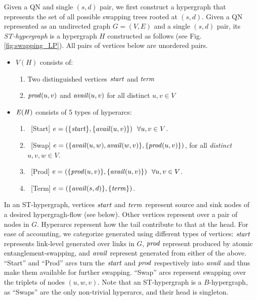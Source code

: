 Given a QN and single $(s,d)$ pair, we first construct a hypergraph 
that represents the set of all possible swapping trees rooted
at $(s,d)$.
Given a QN represented as an undirected graph $G=(V,E)$
and a single $(s,d)$ pair, its \emph{ST-hypergraph} 
is a hypergraph $H$ constructed as follows  (see 
Fig. \ref{fig:swapping_LP}). All pairs of 
vertices below are unordered pairs.
\begin{itemize}
\item $V(H)$ consists of:
  \begin{enumerate}
  \item Two distinguished vertices $\mathit{start}$ and $\mathit{term}$
  \item $\mathit{prod}(u,v)$ and $\mathit{avail}(u,v)$ for all distinct $u, v \in
    V$
  \end{enumerate}
\item $\mathit{E(H)}$ consists of 5 types of hyperarcs:
  \begin{enumerate}
  \item\ [Start] $e = (\{\mathit{start}\}, \{\mathit{avail}(u,v)\}) \ \ \forall u,v \in V$.
  \item\ [Swap] $e = (\{\mathit{avail}(u,w),  \mathit{avail}(w,v)\}, \{\mathit{prod}(u,v)\})$, for all \emph{distinct} $u,v,w \in V$.
  \item\ [Prod] $e = (\{\mathit{prod}(u,v)\}, \{\mathit{avail}(u,v)\})\ \ \forall u,v \in V$.
  \item\ [Term]  $e = (\{\mathit{avail}(s,d)\}, \{\mathit{term}\})$.
  \end{enumerate}
 \end{itemize}
In an ST-hypergraph, vertices $\mathit{start}$ and $\mathit{term}$
represent source and sink nodes of a desired hypergragh-flow (see below).
Other vertices represent \epss over a pair of nodes in $G$.
Hyperarcs
represent how the tail \epss contribute to that at the head. 
For ease of accounting, we categorize generated \epss using different
types of vertices:
$\mathit{start}$ represents link-level \epss generated over links in $G$, 
%
$\mathit{prod}$ represent \epss produced by atomic entanglement-swapping, 
%
and $\mathit{avail}$ represent \epss generated from either of the above.
``Start'' and ``Prod'' arcs turn the $\mathit{start}$ and 
$\mathit{prod}$ \epss respectively into  $\mathit{avail}$ \epss and 
thus make them available for further swapping. 
``Swap'' arcs represent swapping over the triplets of nodes $(u,w,v)$.
Note that an ST-hypergraph is a $B$-hypergraph, as ``Swaps''
are the only non-trivial hyperarcs, and their head is singleton.


